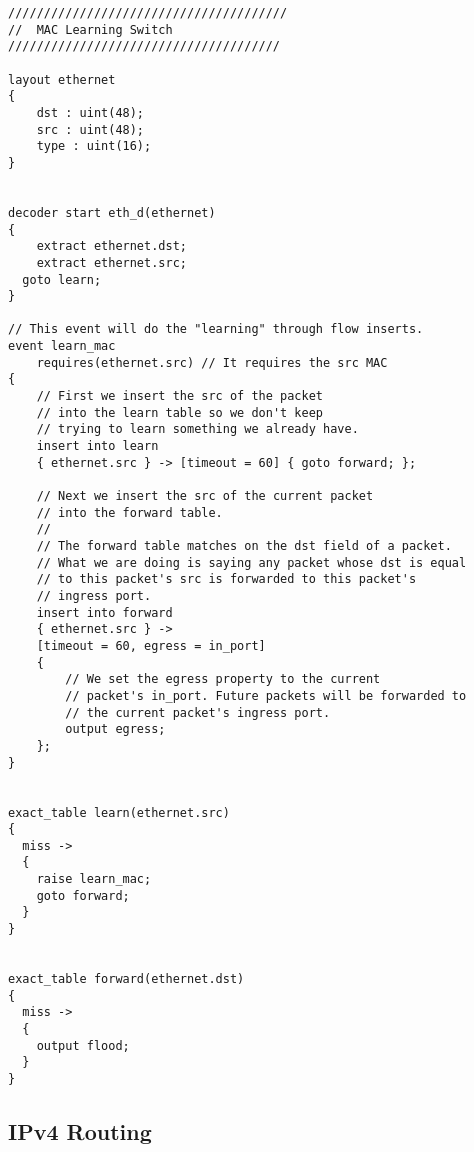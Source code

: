 \begin{lstlisting}
///////////////////////////////////////
//  MAC Learning Switch
//////////////////////////////////////

layout ethernet
{
	dst : uint(48);
	src : uint(48);
	type : uint(16);
}


decoder start eth_d(ethernet)
{
	extract ethernet.dst;
	extract ethernet.src;
  goto learn;
}

// This event will do the "learning" through flow inserts.
event learn_mac
	requires(ethernet.src) // It requires the src MAC
{
	// First we insert the src of the packet
	// into the learn table so we don't keep
	// trying to learn something we already have.
	insert into learn
	{ ethernet.src } -> [timeout = 60] { goto forward; };

	// Next we insert the src of the current packet
	// into the forward table.
	//
	// The forward table matches on the dst field of a packet.
	// What we are doing is saying any packet whose dst is equal
	// to this packet's src is forwarded to this packet's
	// ingress port.
	insert into forward
	{ ethernet.src } ->
	[timeout = 60, egress = in_port]
	{
		// We set the egress property to the current
		// packet's in_port. Future packets will be forwarded to
		// the current packet's ingress port.
		output egress;
	};
}


exact_table learn(ethernet.src)
{
  miss ->
  {
	raise learn_mac;
    goto forward;
  }
}


exact_table forward(ethernet.dst)
{
  miss ->
  {
    output flood;
  }
}
\end{lstlisting}


\subsection{IPv4 Routing}

